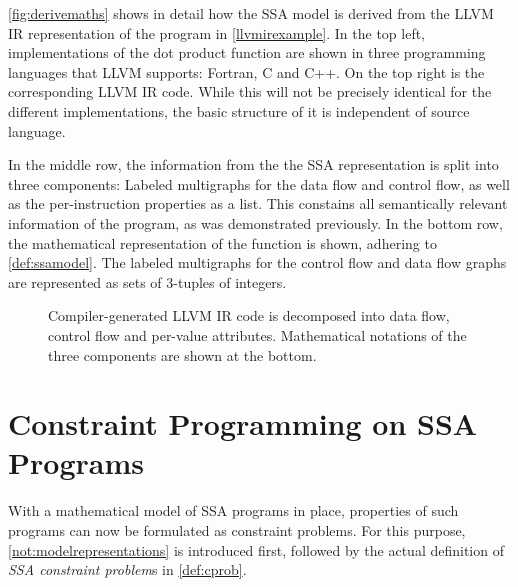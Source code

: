 \newpage

    \autoref{fig:derivemaths} shows in detail how the SSA model is derived from
    the LLVM IR representation of the program in \autoref{llvmirexample}.
    In the top left, implementations of the dot product function are shown
    in three programming languages that LLVM supports: Fortran, C and C++.
    On the top right is the corresponding LLVM IR code.
    While this will not be precisely identical for the different
    implementations, the basic structure of it is independent of source
    language.

    In the middle row, the information from the the SSA representation is split
    into three components:
    Labeled multigraphs for the data flow and control flow, as well as
    the per-instruction properties as a list.
    This constains all semantically relevant information of the program, as was
    demonstrated previously.
    In the bottom row, the mathematical representation of the function is shown,
    adhering to \autoref{def:ssamodel}.
    The labeled multigraphs for the control flow and data flow graphs are
    represented as sets of $3$-tuples of integers.

\begin{figure}[p]

\caption{Compiler-generated LLVM IR code is decomposed into data flow, control
         flow and per-value attributes.
         Mathematical notations of the three components are shown at the
         bottom.}
\label{fig:derivemaths}
\end{figure}

\section{Constraint Programming on SSA Programs}

    With a mathematical model of SSA programs in place, properties of such
    programs can now be formulated as constraint problems.
    For this purpose, \autoref{not:modelrepresentations} is introduced first,
    followed by the actual definition of {\em SSA constraint problem}s in
    \autoref{def:cprob}.

